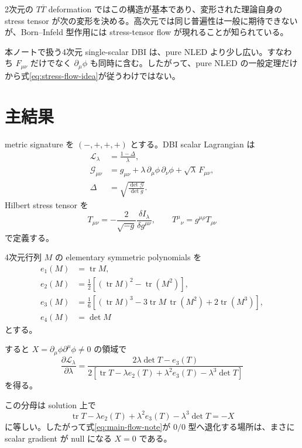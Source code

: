 \documentclass[a4paper,11pt]{ltjsreport}
\newcommand{\tr}{\operatorname{tr}}
\newcommand{\Lag}{\mathcal L}
\newcommand{\G}{\mathcal G}
\begin{document}
2次元の $T\overline T$ deformation ではこの構造が基本であり、変形された理論自身の stress tensor が次の変形を決める。高次元では同じ普遍性は一般に期待できないが、Born--Infeld 型作用には stress-tensor flow が現れることが知られている\cite{SmirnovZamolodchikov2016,Brizio2026,Ferko2023a}。

本ノートで扱う4次元 single-scalar DBI は、pure NLED より少し広い。すなわち $F_{\mu\nu}$ だけでなく $\partial_\mu\phi$ も同時に含む。したがって、pure NLED の一般定理だけから式\eqref{eq:stress-flow-idea}が従うわけではない。

\section{主結果}

metric signature を $(-,+,+,+)$ とする。DBI scalar Lagrangian は
\begin{align}
 \Lag_\lambda&=\frac{1-\Delta}{\lambda},
 \label{eq:L-main}\\
 \G_{\mu\nu}&=g_{\mu\nu}
 +\lambda\,\partial_\mu\phi\,\partial_\nu\phi
 +\sqrt\lambda\,F_{\mu\nu},
 \label{eq:G-main}\\
 \Delta&=\sqrt{\frac{\det\G}{\det g}}.
 \label{eq:Delta-main}
\end{align}
Hilbert stress tensor を
\begin{equation}
 T_{\mu\nu}
 =-\frac{2}{\sqrt{-g}}\frac{\delta I_\lambda}{\delta g^{\mu\nu}},
 \qquad
 T^\mu{}_{\nu}=g^{\mu\rho}T_{\rho\nu}
 \label{eq:Tdef-main}
\end{equation}
で定義する。

4次元行列 $M$ の elementary symmetric polynomials を
\begin{align}
 e_1(M)&=\tr M,\nonumber\\
 e_2(M)&=\frac12\left[(\tr M)^2-\tr(M^2)\right],\label{eq:e2-main}\\
 e_3(M)&=\frac16\left[(\tr M)^3-3\tr M\,\tr(M^2)+2\tr(M^3)\right],\label{eq:e3-main}\\
 e_4(M)&=\det M
 \label{eq:e4-main}
\end{align}
とする。

すると $X=\partial_\mu\phi\partial^\mu\phi\neq0$ の領域で
\begin{equation}
 \frac{\partial\Lag_\lambda}{\partial\lambda}
 =\frac{2\lambda\det T-e_3(T)}
 {2\left[\tr T-\lambda e_2(T)+\lambda^2e_3(T)-\lambda^3\det T\right]}
 \label{eq:main-flow-note}
\end{equation}
を得る。

この分母は solution 上で
\begin{equation}
 \tr T-\lambda e_2(T)+\lambda^2e_3(T)-\lambda^3\det T=-X
 \label{eq:den-is-X}
\end{equation}
に等しい。したがって式\eqref{eq:main-flow-note}が $0/0$ 型へ退化する場所は、まさに scalar gradient が null になる $X=0$ である。
\end{document}
